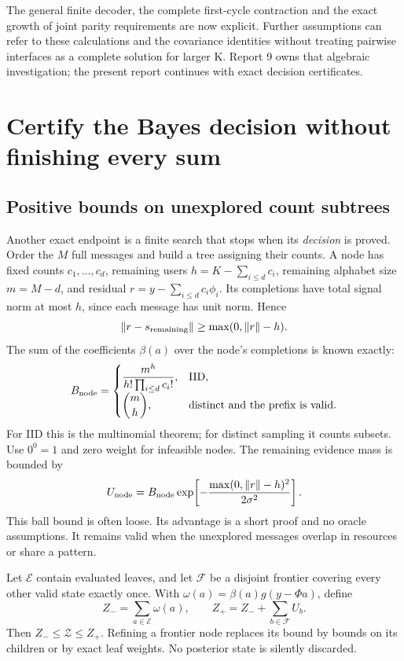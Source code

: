 \documentclass[10pt,a4paper]{article}
\begin{document}
The general finite decoder, the complete first-cycle contraction and the exact growth of joint parity
requirements are now explicit. Further assumptions can refer to these calculations and the covariance
identities without treating pairwise interfaces as a complete solution for larger K. Report 9 owns that
algebraic investigation; the present report continues with exact decision certificates.

\clearpage
\section{Certify the Bayes decision without finishing every sum}
\label{sec:certificate}
\subsection{Positive bounds on unexplored count subtrees}
Another exact endpoint is a finite search that stops when its \emph{decision} is proved.
Order the $M$ full messages and build a tree assigning their counts.
A node has fixed counts $c_1,\ldots,c_d$, remaining users $h=K-\sum_{i\leq d}c_i$,
remaining alphabet size $m=M-d$, and residual $r=y-\sum_{i\leq d}c_i\phi_i$.
Its completions have total signal norm at most $h$, since each message has unit norm. Hence
\[
 \|r-s_{\rm remaining}\|\geq \max(0,\|r\|-h).
\]
The sum of the coefficients $\beta(a)$ over the node's completions is known exactly:
\begin{equation}
 B_{\rm node}=
 \begin{cases}
 \displaystyle\frac{m^h}{h!\prod_{i\leq d}c_i!},&\text{IID},\\[1mm]
 \displaystyle\binom mh,&\text{distinct and the prefix is valid}.
 \end{cases}
 \label{eq:subtree-prior}
\end{equation}
For IID this is the multinomial theorem; for distinct sampling it counts subsets.
Use $0^0=1$ and zero weight for infeasible nodes. The remaining evidence mass is bounded by
\begin{equation}
 U_{\rm node}=B_{\rm node}
 \exp\!\left[-\frac{\max(0,\|r\|-h)^2}{2\sigma^2}\right].
 \label{eq:subtree-bound}
\end{equation}
This ball bound is often loose. Its advantage is a short proof and no oracle assumptions.
It remains valid when the unexplored messages overlap in resources or share a pattern.

Let $\mathcal E$ contain evaluated leaves, and let $\mathcal F$ be a disjoint frontier covering every other
valid state exactly once. With $\omega(a)=\beta(a)g(y-\Phi a)$, define
\[
 Z_-=\sum_{a\in\mathcal E}\omega(a),\qquad
 Z_+=Z_-+\sum_{b\in\mathcal F}U_b.
\]
Then $Z_-\leq\mathcal Z\leq Z_+$. Refining a frontier node replaces its bound by bounds on its children or by
exact leaf weights. No posterior state is silently discarded.
\end{document}
